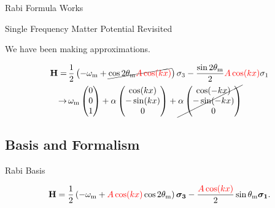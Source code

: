 \documentclass[9pt]{beamer}
\begin{document}
\begin{darkframes}
\begin{frame}{Rabi Formula Works}
\end{frame}





\begin{frame}{Single Frequency Matter Potential Revisited}

We have been making approximations.


\begin{align*}
    \mathbf {H} =\,& \frac{1}{2}\left( - \omega_{\mathrm{m}}
    +\cancel{
     \cos 2\theta_{\mathrm{m}}{\color{red}A\cos(kx)} } \right) \sigma_3 - \frac{  \sin 2\theta_{\mathrm{m}
    }
    }{2}{\color{red}A \cos(kx)}  \sigma_1 \\
    \to\, &  \omega_{\mathrm m}\begin{pmatrix}
    0\\
    0\\
    1
    \end{pmatrix} + \alpha \begin{pmatrix}
    \cos (kx)\\
    -\sin(k x)\\
    0
    \end{pmatrix}  + \cancel{\alpha \begin{pmatrix}
    \cos (-kx)\\
    -\sin( - k x)\\
    0
    \end{pmatrix}
    }
\end{align*}


\end{frame}



\subsection{Basis and Formalism}



\begin{frame}{Rabi Basis}



\begin{tcolorbox}[title=Hamiltonian in Background Matter Basis]
    \begin{equation*}
    \mathbf {H} = \frac{1}{2}\left( - \omega_{\mathrm{m}} + {\color{red}A\cos(kx)} \cos 2\theta_{\mathrm{m}} \right) \boldsymbol{\sigma_3} - \frac{  {\color{red}A\cos (kx)}  }{2} \sin \theta_{\mathrm{m}} \boldsymbol{\sigma_1}.
\end{equation*}
\end{tcolorbox}



\end{frame}
\end{darkframes}
\end{document}

